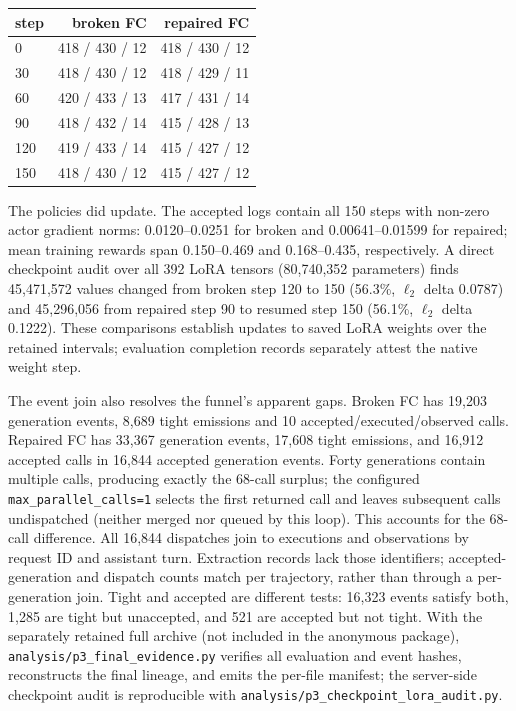 \begin{center}
\begin{minipage}{\linewidth}
\centering
\small
{}\label{tab:p3curve}
\begin{tabular}{@{}lrr@{}}
\toprule
step & broken FC & repaired FC \\
\midrule
0   & 418 / 430 / 12 & 418 / 430 / 12 \\
30  & 418 / 430 / 12 & 418 / 429 / 11 \\
60  & 420 / 433 / 13 & 417 / 431 / 14 \\
90  & 418 / 432 / 14 & 415 / 428 / 13 \\
120 & 419 / 433 / 14 & 415 / 427 / 12 \\
150 & 418 / 430 / 12 & 415 / 427 / 12 \\
\bottomrule
\end{tabular}
\end{minipage}
\end{center}

The policies did update. The accepted logs contain all 150 steps with non-zero actor gradient
norms: 0.0120--0.0251 for broken and 0.00641--0.01599 for repaired; mean training rewards span
0.150--0.469 and 0.168--0.435, respectively. A direct checkpoint audit over all 392 LoRA tensors
(80{,}740{,}352 parameters) finds 45{,}471{,}572 values changed from broken step 120 to 150
(56.3\%, $\ell_2$ delta 0.0787) and 45{,}296{,}056 from repaired step 90 to resumed step 150
(56.1\%, $\ell_2$ delta 0.1222). These comparisons establish updates to saved LoRA weights
over the retained intervals; evaluation completion records separately attest the native weight step.

The event join also resolves the funnel's apparent gaps. Broken FC has 19{,}203 generation events,
8{,}689 tight emissions and 10 accepted/executed/observed calls. Repaired FC has 33{,}367
generation events, 17{,}608 tight emissions, and 16{,}912 accepted calls in 16{,}844 accepted
generation events. Forty generations contain multiple calls, producing exactly the 68-call surplus;
the configured \texttt{max\_parallel\_calls=1} selects the first returned call and leaves
subsequent calls undispatched (neither merged nor queued by this loop). This accounts for the
68-call difference. All 16{,}844 dispatches join to executions and observations by request ID and assistant turn.
Extraction records lack those identifiers; accepted-generation and dispatch counts match per
trajectory, rather than through a per-generation join. Tight and accepted are different tests:
16{,}323 events satisfy both, 1{,}285 are tight but unaccepted, and 521 are accepted but not tight.
With the separately retained full archive (not included in the anonymous package),
\texttt{analysis/p3\_final\_evidence.py} verifies all evaluation and event hashes,
reconstructs the final lineage, and emits the per-file manifest; the server-side checkpoint audit is
reproducible with \texttt{analysis/p3\_checkpoint\_lora\_audit.py}.

